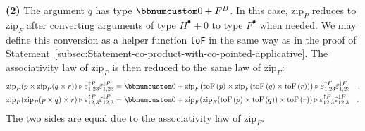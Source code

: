 \textbf{(2)} The argument $q$ has type $\bbnum 0+F^{B}$. In this
case, $\text{zip}_{P}$ reduces to $\text{zip}_{F}$ after converting
arguments of type $H^{\bullet}+0$ to type $F^{\bullet}$ when needed.
We may define this conversion as a helper function \lstinline!toF!
in the same way as in the proof of Statement~\ref{subsec:Statement-co-product-with-co-pointed-applicative}.
The associativity law of $\text{zip}_{P}$ is then reduced to the
same law of $\text{zip}_{F}$:
\begin{align*}
 & \text{zip}_{P}(p\times\text{zip}_{P}(q\times r))\triangleright\varepsilon_{1,23}^{\uparrow P}\tilde{\varepsilon}_{1,23}^{\downarrow P}=\bbnum 0+\text{zip}_{F}\big(\text{toF}\left(p\right)\times\text{zip}_{F}(\text{toF}\left(q\right)\times\text{toF}\left(r\right))\big)\triangleright\varepsilon_{1,23}^{\uparrow F}\tilde{\varepsilon}_{1,23}^{\downarrow F}\quad,\\
 & \text{zip}_{P}(\text{zip}_{P}(p\times q)\times r)\triangleright\varepsilon_{12,3}^{\uparrow P}\tilde{\varepsilon}_{12,3}^{\downarrow P}=\bbnum 0+\text{zip}_{F}(\text{zip}_{F}(\text{toF}\left(p\right)\times\text{toF}\left(q\right))\times\text{toF}\left(r\right))\triangleright\varepsilon_{12,3}^{\uparrow F}\tilde{\varepsilon}_{12,3}^{\downarrow F}\quad.
\end{align*}
The two sides are equal due to the associativity law of $\text{zip}_{F}$.

